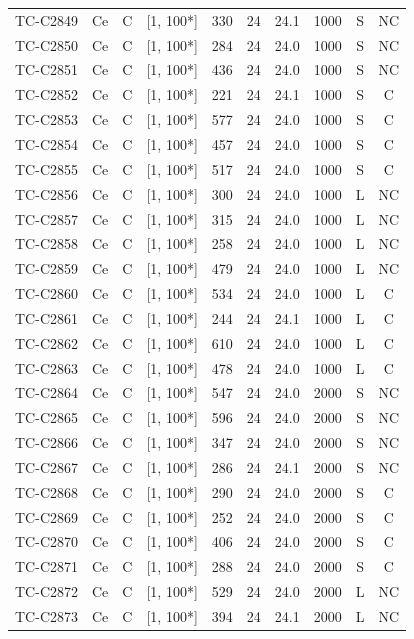 \begin{longtable}{lccccccccc}
TC-C2849 & Ce & C & [1, 100*] & 330 & 24 & 24.1 & 1000 & S & NC \\
TC-C2850 & Ce & C & [1, 100*] & 284 & 24 & 24.0 & 1000 & S & NC \\
TC-C2851 & Ce & C & [1, 100*] & 436 & 24 & 24.0 & 1000 & S & NC \\
TC-C2852 & Ce & C & [1, 100*] & 221 & 24 & 24.1 & 1000 & S & C \\
TC-C2853 & Ce & C & [1, 100*] & 577 & 24 & 24.0 & 1000 & S & C \\
TC-C2854 & Ce & C & [1, 100*] & 457 & 24 & 24.0 & 1000 & S & C \\
TC-C2855 & Ce & C & [1, 100*] & 517 & 24 & 24.0 & 1000 & S & C \\
TC-C2856 & Ce & C & [1, 100*] & 300 & 24 & 24.0 & 1000 & L & NC \\
TC-C2857 & Ce & C & [1, 100*] & 315 & 24 & 24.0 & 1000 & L & NC \\
TC-C2858 & Ce & C & [1, 100*] & 258 & 24 & 24.0 & 1000 & L & NC \\
TC-C2859 & Ce & C & [1, 100*] & 479 & 24 & 24.0 & 1000 & L & NC \\
TC-C2860 & Ce & C & [1, 100*] & 534 & 24 & 24.0 & 1000 & L & C \\
TC-C2861 & Ce & C & [1, 100*] & 244 & 24 & 24.1 & 1000 & L & C \\
TC-C2862 & Ce & C & [1, 100*] & 610 & 24 & 24.0 & 1000 & L & C \\
TC-C2863 & Ce & C & [1, 100*] & 478 & 24 & 24.0 & 1000 & L & C \\
TC-C2864 & Ce & C & [1, 100*] & 547 & 24 & 24.0 & 2000 & S & NC \\
TC-C2865 & Ce & C & [1, 100*] & 596 & 24 & 24.0 & 2000 & S & NC \\
TC-C2866 & Ce & C & [1, 100*] & 347 & 24 & 24.0 & 2000 & S & NC \\
TC-C2867 & Ce & C & [1, 100*] & 286 & 24 & 24.1 & 2000 & S & NC \\
TC-C2868 & Ce & C & [1, 100*] & 290 & 24 & 24.0 & 2000 & S & C \\
TC-C2869 & Ce & C & [1, 100*] & 252 & 24 & 24.0 & 2000 & S & C \\
TC-C2870 & Ce & C & [1, 100*] & 406 & 24 & 24.0 & 2000 & S & C \\
TC-C2871 & Ce & C & [1, 100*] & 288 & 24 & 24.0 & 2000 & S & C \\
TC-C2872 & Ce & C & [1, 100*] & 529 & 24 & 24.0 & 2000 & L & NC \\
TC-C2873 & Ce & C & [1, 100*] & 394 & 24 & 24.1 & 2000 & L & NC \\

\end{longtable}
